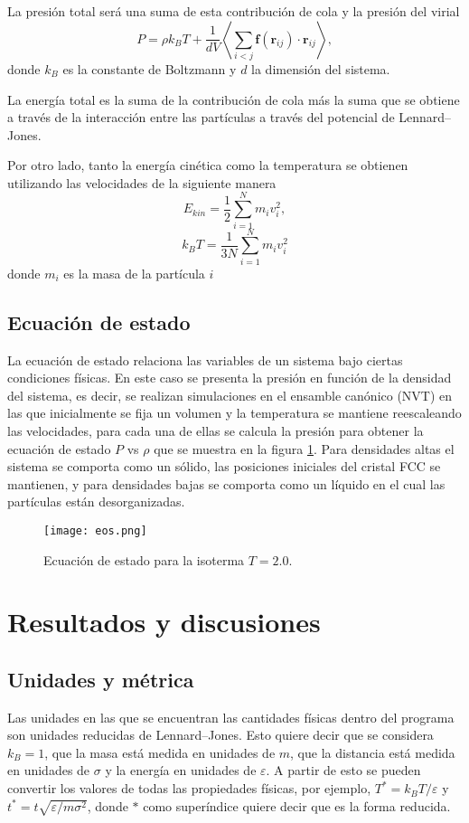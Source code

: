 \documentclass[a4paper,spanish,12pt,twoside]{article}
\begin{document}
La presión total será una suma de esta contribución de cola y la presión del virial
$$
P = \rho k_BT + \frac{1}{dV} \left\langle \sum_{i<j} \mathbf{f}(\mathbf{r}_{ij}) \cdot \mathbf{r}_{ij} \right\rangle,
$$
donde $k_B$ es la constante de Boltzmann y $d$ la dimensión del sistema.

La energía total es la suma de la contribución de cola más la suma que se obtiene a través de la interacción entre las partículas a través del potencial de Lennard--Jones.

Por otro lado, tanto la energía cinética como la temperatura se obtienen utilizando las velocidades de la siguiente manera
$$
E_{kin} = \frac{1}{2} \sum_{i=1}^N m_i v_i^2,
$$
$$
k_BT = \frac{1}{3N} \sum_{i=1}^{N} m_i v_i^2
$$
donde $m_i$ es la masa de la partícula $i$

\subsection{Ecuación de estado}

La ecuación de estado relaciona las variables de un sistema bajo ciertas condiciones físicas. En este caso se presenta la presión en función de la densidad del sistema, es decir, se realizan simulaciones en el ensamble canónico (NVT) en las que inicialmente se fija un volumen y la temperatura se mantiene reescaleando las velocidades, para cada una de ellas se calcula la presión para obtener la ecuación de estado $P$ vs $\rho$ que se muestra en la figura \ref{fig:eos}. Para densidades altas el sistema se comporta como un sólido, las posiciones iniciales del cristal FCC se mantienen, y para densidades bajas se comporta como un líquido en el cual las partículas están desorganizadas.

\begin{figure}[h]
	\centering
	\texttt{[image: eos.png]}
	\caption{Ecuación de estado para la isoterma $T=2.0$.}
	\label{fig:eos}
\end{figure}


\section{Resultados y discusiones}

\subsection*{Unidades y métrica}

Las unidades en las que se encuentran las cantidades físicas dentro del programa son unidades reducidas de Lennard--Jones. Esto quiere decir que se considera $k_B = 1$, que la masa está medida en unidades de $m$, que la distancia está medida en unidades de $\sigma$ y la energía en unidades de $\varepsilon$. A partir de esto se pueden convertir los valores de todas las propiedades físicas, por ejemplo, $T^* = k_BT/\varepsilon$ y $t^* = t \sqrt{\varepsilon/m\sigma^2}$, donde $*$ como superíndice quiere decir que es la forma reducida.
\end{document}
